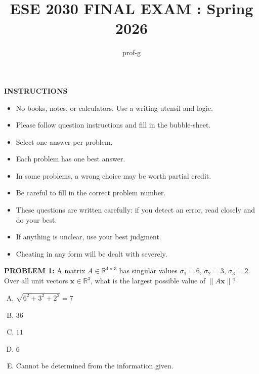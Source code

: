 \documentclass[12pt]{amsart}
\title{ESE 2030 FINAL EXAM : Spring 2026}
\author{prof-g}
\begin{document}
\thispagestyle{firstpage}

\maketitle

\begin{center}
    {\bf INSTRUCTIONS}
\end{center}


\begin{itemize}
\item 
No books, notes, or calculators. Use a writing utensil and logic. 

\item 
Please follow question instructions and fill in the bubble-sheet. 

\item 
Select one answer per problem.

\item 
Each problem has one best answer. 

\item 
In some problems, a wrong choice may be worth partial credit. 

\item 
Be careful to fill in the correct problem number. 

\item 
These questions are written carefully: if you detect an error, read closely and do your best.

\item 
If anything is unclear, use your best judgment. 

\item 
Cheating in any form will be dealt with severely. 
\end{itemize}

\newpage


{\bf PROBLEM 1:}
A matrix $A \in \mathbb{R}^{4 \times 3}$ has singular values $\sigma_1 = 6$, $\sigma_2 = 3$, $\sigma_3 = 2$.
%
Over all unit vectors $\mathbf{x} \in \mathbb{R}^3$, what is the largest possible value of $\|A\mathbf{x}\|$?

\begin{enumerate}[(A)]
\item $\sqrt{6^2 + 3^2 + 2^2} = 7$
\item $36$
\item $11$
\item $6$
\item Cannot be determined from the information given.
\end{enumerate}
\end{document}
